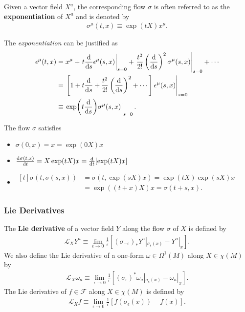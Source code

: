 \documentclass[10pt]{article}
\begin{document}
Given a vector field $X^a$, the corresponding flow $\sigma$ is often referred to as the \textbf{exponentiation} of $X^a$ and is denoted by
\begin{align}
    \sigma^\mu(t,x)\equiv\exp(tX)x^\mu.
\end{align}
\begin{remark}
    The \textit{exponentiation} can be justified as
    \begin{align}
        \epsilon^\mu(t,x) & =x^\mu+\eval{t\dv{s}\epsilon^\mu(s,x)}_{s=0}+\eval{\frac{t^2}{2!}\left(\dv{s}\right)^2\sigma^{\mu}(s,x)}_{s=0}+\cdots\notag \\
                          & =\eval{\left[1+t\dv{s}+\frac{t^2}{2!}\left(\dv{s}\right)^2+\cdots\right]\epsilon^{\mu}(s,x)}_{s=0}\notag                    \\
                          & \equiv\eval{\exp(t\dv{s})\sigma^\mu(s,x)}_{s=0}.
    \end{align}
\end{remark}
\begin{property}
    The flow $\sigma$ satisfies
    \begin{itemize}
        \item $\sigma(0,x)=x=\exp(0X)x$
        \item $\dv{\sigma(t,x)}{t}=X\exp(tX)x=\dv{t}[\exp(tX)x]$
        \item $\begin{aligned}[t]
                      \sigma(t,\sigma(s,x)) & =\sigma(t,\exp(sX)x)=\exp(tX)\exp(sX)x \\
                                            & =\exp((t+x)X)x=\sigma(t+s,x).
                  \end{aligned}$
    \end{itemize}
\end{property}


\subsubsection{Lie Derivatives}
\begin{definition}
    The \textbf{Lie derivative} of a vector field $Y$ along the flow $\sigma$ of $X$ is defined by
    \begin{align}
        \mathcal{L}_X Y^a \equiv\lim_{\epsilon\to0}\frac{1}{\epsilon}[(\sigma_{-\epsilon})_* Y^a|_{\sigma_{\epsilon}(x)}-Y^a|_x].\label{liederivativevector}
    \end{align}
    We also define the Lie derivative of a one-form $\omega\in\Omega^1(M)$ along $X\in\chi(M)$ by
    \begin{align}
        \mathcal{L}_X \omega_a\equiv\lim_{\epsilon\to0}\frac{1}{\epsilon}\left[(\sigma_\epsilon)^*\omega_a|_{\sigma_\epsilon(x)}-\omega_a|_x\right].
    \end{align}
    The Lie derivative of $f\in\mathcal{F}$ along $X\in\chi(M)$ is defined by
    \begin{align}
        \mathcal{L}_X f\equiv\lim_{\epsilon\to0}\frac{1}{\epsilon}\left[f(\sigma_\epsilon(x))-f(x)\right].
    \end{align}
\end{definition}
\end{document}
